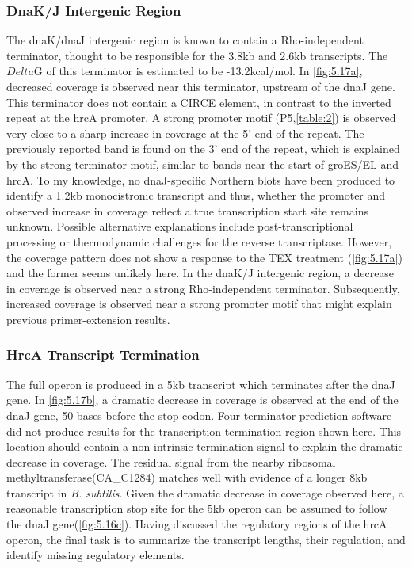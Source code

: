 \subsubsection{DnaK/J Intergenic Region}
The dnaK/dnaJ intergenic region is known to contain a Rho-independent terminator\cite{80,81}, thought to be responsible for the 3.8kb and 2.6kb transcripts. The \(Delta\)G of this terminator is estimated to be -13.2kcal/mol. In \ref{fig:5.17a}, decreased coverage is observed near this terminator, upstream of the dnaJ gene. This terminator does not contain a CIRCE element, in contrast to the inverted repeat at the hrcA promoter. A strong promoter motif (P5,\ref{table:2}) is observed very close to a sharp increase in coverage at the 5' end of the repeat. The previously reported band is found on the 3' end of the repeat, which is explained by the strong terminator motif, similar to bands near the start of groES/EL and hrcA. To my knowledge, no dnaJ-specific Northern blots have been produced to identify a 1.2kb monocistronic transcript and thus, whether the promoter and observed increase in coverage reflect a true transcription start site remains unknown. Possible alternative explanations include post-transcriptional processing or thermodynamic challenges for the reverse transcriptase\cite{80}. However, the coverage pattern does not show a response to the TEX treatment (\ref{fig:5.17a}) and the former seems unlikely here. In the dnaK/J intergenic region, a decrease in coverage is observed near a strong Rho-independent terminator. Subsequently, increased coverage is observed near a strong promoter motif that might explain previous primer-extension results\cite{80}.


\subsubsection{HrcA Transcript Termination}
The full operon is produced in a 5kb transcript which terminates after the dnaJ gene. In \ref{fig:5.17b}, a dramatic decrease in coverage is observed at the end of the dnaJ gene, 50 bases before the stop codon. Four terminator prediction software did not produce results for the transcription termination region shown here. This location should contain a non-intrinsic termination signal to explain the dramatic decrease in coverage. The residual signal from the nearby ribosomal methyltransferase(CA_C1284) matches well with evidence of a longer 8kb transcript in \textit{B. subtilis}\cite{81}. Given the dramatic decrease in coverage observed here, a reasonable transcription stop site for the 5kb operon can be assumed to follow the dnaJ gene(\ref{fig:5.16c}). Having discussed the regulatory regions of the hrcA operon, the final task is to summarize the transcript lengths, their regulation, and identify missing regulatory elements.



